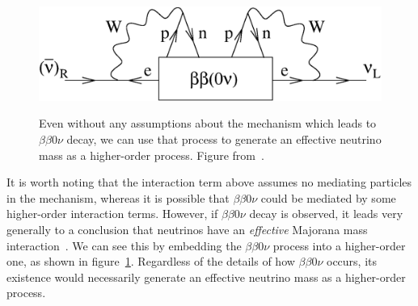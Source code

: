 \begin{figure}
\begin{center}
\includegraphics[keepaspectratio=true,width=\textwidth]{Avignone_fig03.eps}
\end{center}
\renewcommand{\baselinestretch}{1}
\small\normalsize
\begin{quote}
\caption{Even without any assumptions about the mechanism which leads to $\beta\beta 0\nu$ decay, we can use that process to generate an effective neutrino mass as a higher-order process.  Figure from~\cite{RMPbb0n}.}
\label{fig:FeynmanBetaBeta0NuImplication}
\end{quote}
\end{figure}
\renewcommand{\baselinestretch}{2}
\small\normalsize

It is worth noting that the interaction term above assumes no mediating particles in the mechanism, whereas it is possible that $\beta\beta 0\nu$ could be mediated by some higher-order interaction terms.  However, if $\beta\beta 0\nu$ decay is observed, it leads very generally to a conclusion that neutrinos have an \emph{effective} Majorana mass interaction~\cite{BlackBoxTheorem}.  We can see this by embedding the $\beta\beta 0\nu$ process into a higher-order one, as shown in figure~\ref{fig:FeynmanBetaBeta0NuImplication}.  Regardless of the details of how $\beta\beta 0\nu$ occurs, its existence would necessarily generate an effective neutrino mass as a higher-order process.

